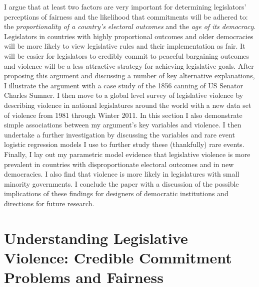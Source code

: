 \documentclass[a4paper]{article}\usepackage[]{graphicx}\usepackage[]{color}
\begin{document}
I argue that at least two factors are very important for determining legislators' perceptions of fairness and the likelihood that commitments will be adhered to: the \emph{proportionality of a country's electoral outcomes} and the \emph{age of its democracy}. Legislators in countries with highly proportional outcomes and older democracies will be more likely to view legislative rules and their implementation as fair. It will be easier for legislators to credibly commit to peaceful bargaining outcomes and violence will be a less attractive strategy for achieving legislative goals. After proposing this argument and discussing a number of key alternative explanations, I illustrate the argument with a case study of the 1856 canning of US Senator Charles Sumner. I then move to a global level survey of legislative violence by describing violence in national legislatures around the world with a new data set of violence from 1981 through Winter 2011. In this section I also demonstrate simple associations between my argument's key variables and violence. I then undertake a further investigation by discussing the variables and rare event logistic regression models \citep{KingRareEvents2001, KingRareEventsPA2001} I use to further study these (thankfully) rare events. Finally, I lay out my parametric model evidence that legislative violence is more prevalent in countries with disproportionate electoral outcomes and in new democracies. I also find that violence is more likely in legislatures with small minority governments. I conclude the paper with a discussion of the possible implications of these findings for designers of democratic institutions and directions for future research.


\section{Understanding Legislative Violence: Credible Commitment Problems and Fairness}
\end{document}
